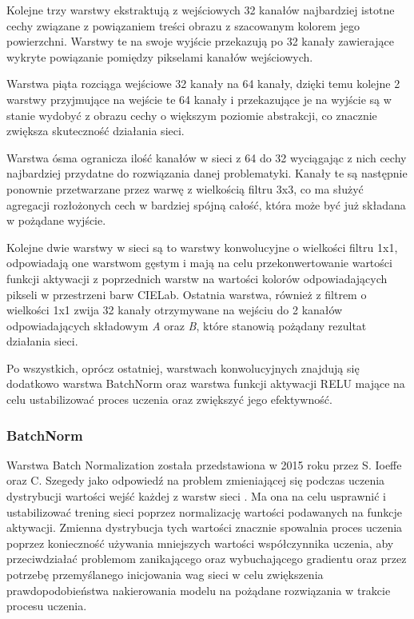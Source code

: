   Kolejne trzy warstwy ekstraktują z wejściowych 32 kanałów najbardziej istotne
  cechy związane z powiązaniem treści obrazu z szacowanym kolorem jego powierzchni.
  Warstwy te na swoje wyjście przekazują po 32 kanały zawierające wykryte
  powiązanie pomiędzy pikselami kanałów wejściowych.

  Warstwa piąta rozciąga wejściowe 32 kanały na 64 kanały, dzięki temu kolejne
  2 warstwy przyjmujące na wejście te 64 kanały i przekazujące je na wyjście są
  w stanie wydobyć z obrazu cechy o większym poziomie abstrakcji, co znacznie
  zwiększa skuteczność działania sieci.

  Warstwa ósma ogranicza ilość kanałów w sieci z 64 do 32 wyciągając z nich
  cechy najbardziej przydatne do rozwiązania danej problematyki. Kanały te są
  następnie ponownie przetwarzane przez warwę z wielkością filtru 3x3, co ma
  służyć agregacji rozłożonych cech w bardziej spójną całość, która może być
  już składana w pożądane wyjście.

  Kolejne dwie warstwy w sieci są to warstwy konwolucyjne o wielkości filtru 1x1,
  odpowiadają one warstwom gęstym i mają na celu przekonwertowanie wartości
  funkcji aktywacji z poprzednich warstw na wartości kolorów odpowiadających
  pikseli w przestrzeni barw CIELab. Ostatnia warstwa, również z filtrem o
  wielkości 1x1 zwija 32 kanały otrzymywane na wejściu do 2 kanałów odpowiadających
  składowym \textit{A} oraz \textit{B}, które stanowią pożądany rezultat działania
  sieci.

  Po wszystkich, oprócz ostatniej, warstwach konwolucyjnych znajdują się dodatkowo
  warstwa BatchNorm oraz warstwa funkcji aktywacji RELU mające na celu
  ustabilizować proces uczenia oraz zwiększyć jego efektywność.

  \subsubsection{BatchNorm}

  Warstwa Batch Normalization została przedstawiona w 2015 roku przez S. Ioeffe
  oraz C. Szegedy jako odpowiedź
  na problem zmieniającej się podczas uczenia dystrybucji wartości wejść
  każdej z warstw sieci \cite{BatchNorm}. Ma ona na celu usprawnić i ustabilizować
  trening sieci poprzez normalizację wartości podawanych na funkcje aktywacji.
  Zmienna dystrybucja tych wartości znacznie spowalnia proces uczenia poprzez
  konieczność używania mniejszych wartości współczynnika uczenia, aby
  przeciwdziałać problemom zanikającego oraz wybuchającego gradientu
  \cite{exploding_vanishing_grad} oraz przez potrzebę przemyślanego inicjowania
  wag sieci w celu zwiększenia prawdopodobieństwa nakierowania modelu na pożądane
  rozwiązania w trakcie procesu uczenia.


